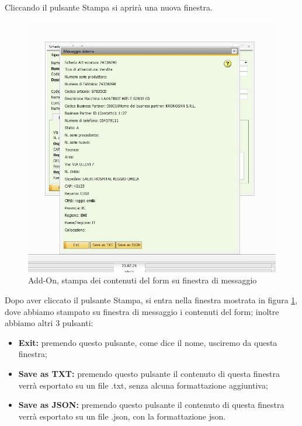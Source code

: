 \newpage

\vspace{1em}

Cliccando il pulsante Stampa si aprirà una nuova finestra.

\begin{figure}[!h] 
	\centering 
	\includegraphics[scale = 0.6]{immagini/add-on/addon-stampa.jpg} 
	\caption{Add-On, stampa dei contenuti del form su finestra di messaggio}
	\label{fig:4-6}
\end{figure}
\begin{flushleft}
	
	Dopo aver cliccato il pulsante Stampa, si entra nella finestra mostrata in figura \ref{fig:4-6}, dove abbiamo stampato su finestra di messaggio i contenuti del form; inoltre abbiamo altri 3 pulsanti:
\end{flushleft}
\begin{itemize}
	\item \textbf{Exit:} premendo questo pulsante, come dice il nome, usciremo da questa finestra;
	\item \textbf{Save as TXT:} premendo questo pulsante il contenuto di questa finestra verrà esportato su un file .txt, senza alcuna formattazione aggiuntiva;
	\item \textbf{Save as JSON:} premendo questo pulsante il contenuto di questa finestra verrà esportato su un file .json, con la formattazione json.
\end{itemize}

